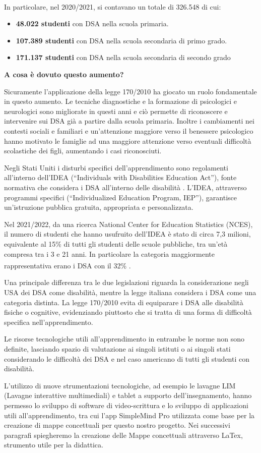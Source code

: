\documentclass[portrait,a4paper]{article} %
\begin{document}
In particolare, nel 2020/2021, si contavano un totale di 326.548 \textsuperscript{\cite{miur}} di cui:
\begin{itemize} 
    \item \textbf{48.022 studenti} con DSA nella scuola primaria.
    \item \textbf{107.389 studenti} con DSA nella scuola secondaria di primo grado.
    \item \textbf{171.137 studenti }con DSA nella scuola secondaria di secondo grado
\end{itemize}
\noindent
\textbf{A cosa è dovuto questo aumento?}
\par
Sicuramente l’applicazione della legge 170/2010 ha giocato un ruolo fondamentale in questo aumento. Le tecniche diagnostiche e la formazione di psicologici e neurologici sono migliorate in questi anni e ciò permette di riconoscere e intervenire sui DSA già a partire dalla scuola primaria. Inoltre i cambiamenti nei contesti sociali e familiari e un'attenzione maggiore verso il benessere psicologico hanno motivato le famiglie ad una maggiore attenzione verso eventuali difficoltà scolastiche dei figli, aumentando i casi riconosciuti.
\par
Negli Stati Uniti i disturbi specifici dell'apprendimento sono regolamenti all'interno dell'IDEA (“Individuals with Disabilities Education Act”), fonte normativa che considera i DSA all’interno delle disabilità . L’IDEA, attraverso programmi specifici (“Individualized Education Program, IEP”), garantisce un'istruzione pubblica gratuita, appropriata e personalizzata.
\par
Nel 2021/2022, da una ricerca National Center for Education Statistics (NCES), il numero di studenti che hanno usufruito dell’IDEA è stato di circa 7,3 milioni, equivalente al 15\% di tutti gli studenti delle scuole pubbliche, tra un'età compresa tra i 3 e 21 anni. In particolare la categoria maggiormente rappresentativa erano i DSA con il 32\% \textsuperscript{\cite{nces}}.
\par
Una principale differenza tra le due legislazioni riguarda la considerazione negli USA dei DSA come disabilità, mentre la legge italiana considera i DSA come una categoria distinta. La legge 170/2010 evita di equiparare i DSA alle disabilità fisiche o cognitive, evidenziando piuttosto che si tratta di una forma di difficoltà specifica nell’apprendimento.
\par
Le risorse tecnologiche utili all’apprendimento in entrambe le norme non sono definite, lasciando spazio di valutazione ai singoli istituti o ai singoli stati considerando le difficoltà dei DSA e nel caso americano di tutti gli studenti con disabilità.
\par
L’utilizzo di nuove strumentazioni tecnologiche, ad esempio le lavagne LIM (Lavagne interattive multimediali) e tablet a supporto dell’insegnamento, hanno permesso lo sviluppo di software di video-scrittura e lo sviluppo di applicazioni utili all’apprendimento, tra cui l’app SimpleMind Pro utilizzata come base per la creazione di mappe concettuali per questo nostro progetto. Nei successivi paragrafi spiegheremo la creazione delle Mappe concettuali attraverso LaTex, strumento utile per la didattica.
\end{document}

